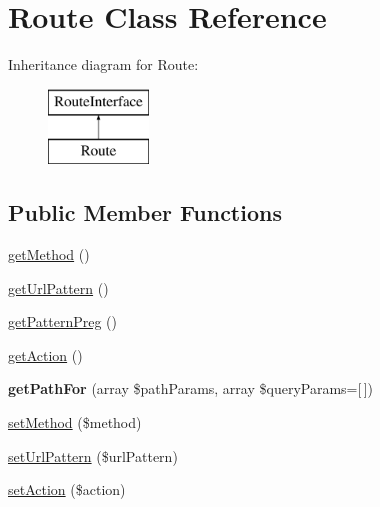\hypertarget{class_pes_1_1_router_1_1_route}{}\section{Route Class Reference}
\label{class_pes_1_1_router_1_1_route}
Inheritance diagram for Route\+:\begin{figure}[H]
\begin{center}
\leavevmode
\includegraphics[height=2.000000cm]{class_pes_1_1_router_1_1_route}
\end{center}
\end{figure}
\subsection*{Public Member Functions}
\begin{DoxyCompactItemize}
\item 
\mbox{\hyperlink{class_pes_1_1_router_1_1_route_af3e37e1a6ed9b8c87f86f659873a83b7}{get\+Method}} ()
\item 
\mbox{\hyperlink{class_pes_1_1_router_1_1_route_af9358000c7c8783880577ca3751a6984}{get\+Url\+Pattern}} ()
\item 
\mbox{\hyperlink{class_pes_1_1_router_1_1_route_a6ed58fc0798710107b88abfbc32871a1}{get\+Pattern\+Preg}} ()
\item 
\mbox{\hyperlink{class_pes_1_1_router_1_1_route_a189a4abe5faf11f4320d5d3f1d3d1715}{get\+Action}} ()
\item 
\mbox{\label{class_pes_1_1_router_1_1_route_a92c7e291e18862ab560db4cdec8f6cce}} 
{\bfseries get\+Path\+For} (array \$path\+Params, array \$query\+Params=\mbox{[}$\,$\mbox{]})
\item 
\mbox{\hyperlink{class_pes_1_1_router_1_1_route_a643c65610f8b3179a8c147cab7cbb652}{set\+Method}} (\$method)
\item 
\mbox{\hyperlink{class_pes_1_1_router_1_1_route_af41294828fa9f8f8d45605c7f5046f83}{set\+Url\+Pattern}} (\$url\+Pattern)
\item 
\mbox{\hyperlink{class_pes_1_1_router_1_1_route_a0366b3b0db0bd90abfc461c372f86599}{set\+Action}} (\$action)
\end{DoxyCompactItemize}


